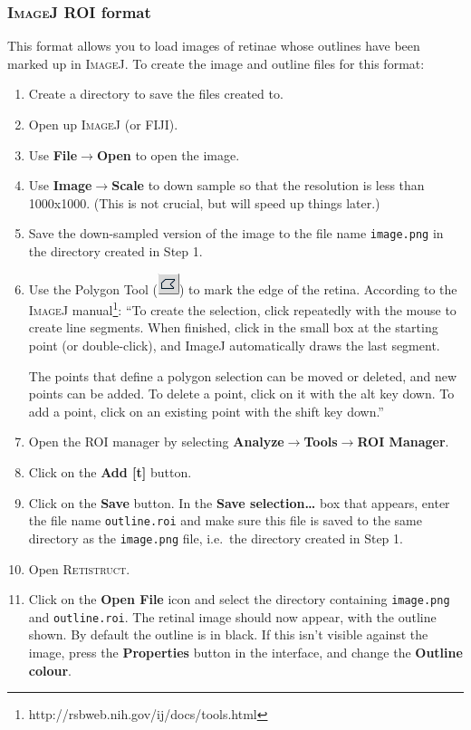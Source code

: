 \documentclass{article}
\begin{document}
\subsubsection{\textsc{ImageJ} ROI format}
\label{retistruct-manual:sec:ijroi-format}

This format allows you to load images of retinae whose outlines have
been marked up in \textsc{ImageJ}. To create the image and outline
files for this format:
\begin{enumerate}
\item Create a directory to save the files created to.
\item Open up \textsc{ImageJ} (or FIJI).
\item Use \textbf{File$\rightarrow$Open} to open the image.
\item Use \textbf{Image$\rightarrow$Scale} to down sample so that the
  resolution is less than 1000x1000. (This is not crucial, but will
  speed up things later.)
\item Save the down-sampled version of the image to the file name
  \texttt{image.png} in the directory created in Step 1.
\item Use the Polygon Tool
  (\includegraphics[height=\baselineskip]{poly}) to mark the edge of
  the retina. According to the \textsc{ImageJ}
  manual\footnote{http://rsbweb.nih.gov/ij/docs/tools.html}: ``To
  create the selection, click repeatedly with the mouse to create line
  segments. When finished, click in the small box at the starting
  point (or double-click), and ImageJ automatically draws the last
  segment.

  The points that define a polygon selection can be moved or deleted,
  and new points can be added. To delete a point, click on it with the
  alt key down. To add a point, click on an existing point with the
  shift key down.''
\item Open the ROI manager by selecting
\textbf{Analyze$\rightarrow$Tools$\rightarrow$ROI Manager}.
\item Click on the \textbf{Add [t]} button.
\item Click on the \textbf{Save} button. In the \textbf{Save
selection\dots} box that appears, enter the file name
\texttt{outline.roi} and make sure this file is saved to the same
directory as the \texttt{image.png} file, i.e.\ the directory created
in Step 1.
\item Open \textsc{Retistruct}.
\item Click on the \textbf{Open File} icon and select the directory
containing \texttt{image.png} and \texttt{outline.roi}. The retinal
image should now appear, with the outline shown. By default the
outline is in black. If this isn't visible against the image, press
the \textbf{Properties} button in the interface, and change the
\textbf{Outline colour}.
\end{enumerate}
\end{document}
